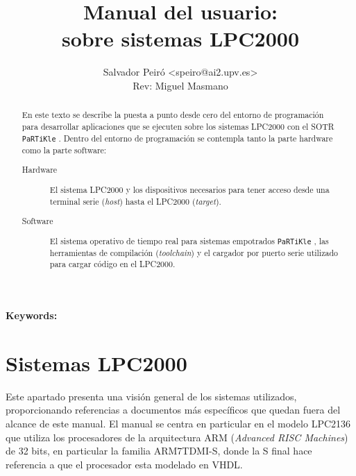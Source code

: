 \documentclass[10pt,a4paper]{article}
\title{Manual del usuario:\\
	\partikle{} sobre sistemas LPC2000}
\author {Salvador Peiró <speiro@ai2.upv.es>\\%
	\small{Rev: Miguel Masmano}}
\newcommand{\partikle}[0]{\texttt{PaRTiKle}}
\begin{document}
\maketitle

\begin{abstract}
	En este texto se describe la puesta a punto desde cero del entorno de programación para desarrollar aplicaciones que se ejecuten sobre los sistemas LPC2000 con el SOTR \partikle{} \cite{partikleos}.
	Dentro del entorno de programación se contempla tanto la parte hardware como la parte software:
	
	 \begin{description}
	 \item[Hardware]
	 El sistema LPC2000 y los dispositivos necesarios para tener acceso desde una terminal serie (\emph{host}) hasta el LPC2000 (\emph{target}). 


	 \item[Software]
	 El sistema operativo de tiempo real para sistemas empotrados \partikle{} \cite{partikleos}, las herramientas de compilación (\emph{toolchain}) y el cargador por puerto serie utilizado para cargar código en el LPC2000.
	 \end{description}

\end{abstract}

\begin{center}
\textbf{Keywords:}
\end{center}

\tableofcontents

\newpage

\section{Sistemas LPC2000}

	Este apartado presenta una visión general de los sistemas utilizados, proporcionando referencias a documentos más específicos que quedan fuera del alcance de este manual.  El manual se centra en particular en el modelo LPC2136 que utiliza los procesadores de la arquitectura ARM (\emph{Advanced RISC Machines}) de 32 bits, en particular la familia ARM7TDMI-S, donde la S final hace referencia a que el procesador esta modelado en VHDL.
	
\end{document}
